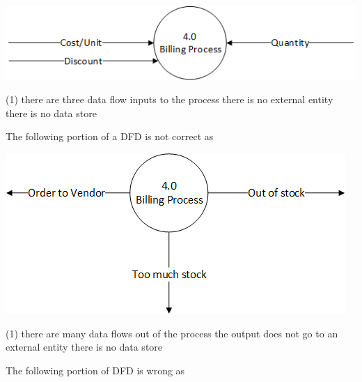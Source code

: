\documentclass{article}
\begin{document}
\begin{questions}
\begin{exercise}
        \includegraphics{Q1.png}

        \begin{choice}(1)
            \choice {}
            \choice there are three data flow inputs to the process
            \choice there is no external entity
            \choice there is no data store
        \end{choice}
    \end{exercise}
    \begin{exercise}
        The following portion of a DFD is not correct as

        \includegraphics{Q2.png}
        \begin{choice}(1)
            \choice there are many data flows out of the process
            \choice {}
            \choice the output does not go to an external entity
            \choice there is no data store
        \end{choice}
    \end{exercise}
    \begin{exercise}
        The following portion of DFD is wrong as


\end{exercise}
\end{questions}
\end{document}
